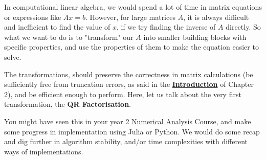 In computational linear algebra, we would spend a lot of time in matrix equations or expressions like $Ax = b$. However, for large matrices  $A$, it is always difficult and inefficient to find the value of $x$, if we try finding the inverse of $A$ directly. So what we want to do is to "transform" our $A$ into smaller building blocks with specific properties, and use the properties of them to make the equation easier to solve. 

\medskip
\noindent The transformations, should preserve the correctness in matrix calculations (be sufficiently free from truncation errors, as said in the \href{https://comp-lin-alg.github.io/L2_QR_factorisation.html#what-is-the-qr-factorisation}{\textbf{Introduction}} of Chapter 2), and be efficient enough to perform. Here, let us talk about the very first transformation, the \textbf{QR Factorisation}. 
\medskip

\noindent You might have seen this in your year 2 \href{https://github.com/Imperial-MATH50003/MATH50003NumericalAnalysis}{Numerical Analysis} Course, and make some progress in implementation using Julia or Python. We would do some recap and dig further in algorithm stability, and/or time complexities with different ways of implementations.

